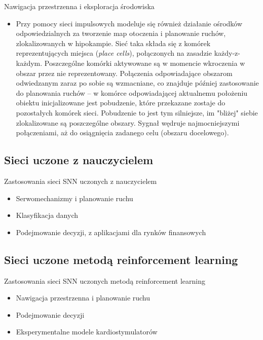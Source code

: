 \documentclass{beamer}
\begin{document}
\begin{frame}{Nawigacja przestrzenna i eksploracja środowiska}

\begin{itemize}

\item Przy pomocy sieci impulsowych modeluje się również działanie ośrodków odpowiedzialnych za tworzenie map otoczenia i planowanie ruchów, zlokalizowanych w hipokampie. Sieć taka składa się z komórek reprezentujących miejsca (\emph{place cells}), połączonych na zasadzie każdy-z-każdym. Poszczególne komórki aktywowane są w momencie wkroczenia w obszar przez nie reprezentowany. Połączenia odpowiadające obszarom odwiedzanym zaraz po sobie są wzmacniane, co znajduje później zastosowanie do planowania ruchów -- w komórce odpowiadającej aktualnemu położeniu obiektu inicjalizowane jest pobudzenie, które przekazane zostaje do pozostałych komórek sieci. Pobudzenie to jest tym silniejsze, im "bliżej" siebie zlokalizowane są poszczególne obszary. Sygnał wędruje najmocniejszymi połączeniami, aż do osiągnięcia zadanego celu (obszaru docelowego).

\end{itemize}

\end{frame}


\subsection{Sieci uczone z nauczycielem}

\begin{frame}{Zastosowania sieci SNN uczonych z nauczycielem}

\begin{itemize}

\item Serwomechanizmy i planowanie ruchu
\item Klasyfikacja danych 
\item Podejmowanie decyzji, z aplikacjami dla rynków finansowych

\end{itemize}

\end{frame}

\subsection{Sieci uczone metodą reinforcement learning}

\begin{frame}{Zastosowania sieci SNN uczonych metodą reinforcement learning}

\begin{itemize}

\item Nawigacja przestrzenna i planowanie ruchu
\item Podejmowanie decyzji
\item Eksperymentalne modele kardiostymulatorów

\end{itemize}

\end{frame}
\end{document}
